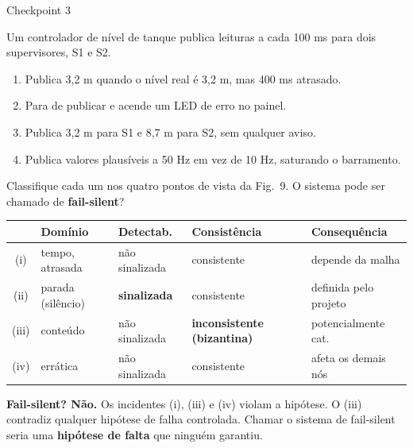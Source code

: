 \documentclass{beamer}
\begin{document}
\begin{frame}{Checkpoint 3}
    \footnotesize
    \begin{checkpoint}
        \scriptsize
        Um controlador de n\'ivel de tanque publica leituras a cada 100 ms para dois supervisores, S1 e S2.
        \begin{enumerate}
            \item[(i)] Publica 3,2 m quando o n\'ivel real \'e 3,2 m, mas 400 ms atrasado.
            \item[(ii)] Para de publicar e acende um LED de erro no painel.
            \item[(iii)] Publica 3,2 m para S1 e 8,7 m para S2, sem qualquer aviso.
            \item[(iv)] Publica valores plaus\'iveis a 50 Hz em vez de 10 Hz, saturando o barramento.
        \end{enumerate}
        Classifique cada um nos quatro pontos de vista da Fig.\ 9. O sistema pode ser chamado de \textbf{fail-silent}?
    \end{checkpoint}
    \pause
    \smallskip
    \scriptsize
    \begin{tabularx}{\linewidth}{@{}c p{2.6cm} p{2.2cm} p{2.4cm} >{\raggedright\arraybackslash}X@{}}
        \toprule
        & \textbf{Dom\'inio} & \textbf{Detectab.} & \textbf{Consist\^encia} & \textbf{Consequ\^encia} \\
        \midrule
        (i) & tempo, atrasada & n\~ao sinalizada & consistente & depende da malha \\
        (ii) & parada (sil\^encio) & \textbf{sinalizada} & consistente & definida pelo projeto \\
        (iii) & conte\'udo & n\~ao sinalizada & \textbf{inconsistente (bizantina)} & potencialmente cat.\ \\
        (iv) & err\'atica & n\~ao sinalizada & consistente & afeta os demais n\'os \\
        \bottomrule
    \end{tabularx}
    \smallskip
    \begin{ancora}
        \scriptsize
        \textbf{Fail-silent? N\~ao.} Os incidentes (i), (iii) e (iv) violam a hip\'otese. O (iii) contradiz qualquer hip\'otese de falha controlada. Chamar o sistema de fail-silent seria uma \textbf{hip\'otese de falta} que ningu\'em garantiu.
    \end{ancora}
\end{frame}
\end{document}
